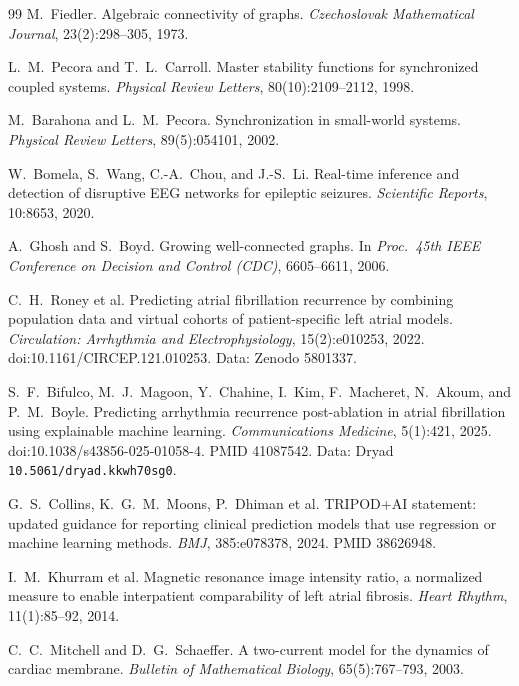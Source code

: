 \documentclass[11pt]{article}
\newcommand{\code}[1]{\texttt{#1}}
\begin{document}
\begingroup\small
\begin{thebibliography}{99}
 M.~Fiedler. Algebraic connectivity of graphs.
\emph{Czechoslovak Mathematical Journal}, 23(2):298--305, 1973.

 L.~M.~Pecora and T.~L.~Carroll. Master stability functions
for synchronized coupled systems. \emph{Physical Review Letters},
80(10):2109--2112, 1998.

 M.~Barahona and L.~M.~Pecora. Synchronization in
small-world systems. \emph{Physical Review Letters}, 89(5):054101, 2002.

 W.~Bomela, S.~Wang, C.-A.~Chou, and J.-S.~Li. Real-time
inference and detection of disruptive EEG networks for epileptic seizures.
\emph{Scientific Reports}, 10:8653, 2020.

 A.~Ghosh and S.~Boyd. Growing well-connected graphs. In
\emph{Proc.\ 45th IEEE Conference on Decision and Control (CDC)}, 6605--6611, 2006.

 C.~H.~Roney et al. Predicting atrial fibrillation recurrence
by combining population data and virtual cohorts of patient-specific left atrial
models. \emph{Circulation: Arrhythmia and Electrophysiology}, 15(2):e010253, 2022.
doi:10.1161/CIRCEP.121.010253. Data: Zenodo 5801337.

 S.~F.~Bifulco, M.~J.~Magoon, Y.~Chahine, I.~Kim,
F.~Macheret, N.~Akoum, and P.~M.~Boyle. Predicting arrhythmia
recurrence post-ablation in atrial fibrillation using explainable machine
learning. \emph{Communications Medicine}, 5(1):421, 2025.
doi:10.1038/s43856-025-01058-4. PMID 41087542.
Data: Dryad \code{10.5061/dryad.kkwh70sg0}.

 G.~S.~Collins, K.~G.~M.~Moons, P.~Dhiman et al.
TRIPOD+AI statement: updated guidance for reporting clinical prediction models
that use regression or machine learning methods. \emph{BMJ}, 385:e078378, 2024.
PMID 38626948.

 I.~M.~Khurram et al. Magnetic resonance image intensity
ratio, a normalized measure to enable interpatient comparability of left atrial
fibrosis. \emph{Heart Rhythm}, 11(1):85--92, 2014.

 C.~C.~Mitchell and D.~G.~Schaeffer. A two-current model
for the dynamics of cardiac membrane. \emph{Bulletin of Mathematical Biology},
65(5):767--793, 2003.


\end{thebibliography}
\end{document}

